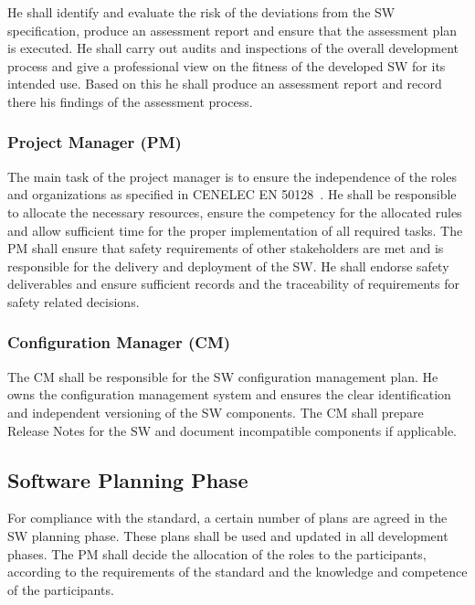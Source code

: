 He shall identify and evaluate the risk of the deviations from the SW
specification, produce an assessment report and ensure that the assessment plan
is executed. He shall carry out audits and inspections of the overall
development process and give a professional view on the fitness of the developed
SW for its intended use. Based on this he shall produce an assessment report and
record there his findings of the assessment process.

\subsubsection{Project Manager (PM)}
\label{sec:project-manager}

The main task of the project manager is to ensure the independence of the roles
and organizations as specified in CENELEC EN 50128~\cite{EN-50128}. He shall be
responsible to allocate the necessary resources, ensure the competency for the
allocated rules and allow sufficient time for the proper implementation of all
required tasks. The PM shall ensure that safety requirements of other
stakeholders are met and is responsible for the delivery and deployment of the
SW. He shall endorse safety deliverables and ensure sufficient records and the
traceability of requirements for safety related decisions.

\subsubsection{Configuration Manager (CM)}
\label{sec:conf-manag}

The CM shall be responsible for the SW configuration management plan. He owns
the configuration management system and ensures the clear identification and
independent versioning of the SW components. The CM shall prepare Release Notes
for the SW and document incompatible components if applicable.

\subsection{Software Planning Phase}
\label{sec:documents--plan}

For compliance with the standard, a certain number of plans are agreed in the SW
planning phase. These plans shall be used and updated in all development
phases. The PM shall decide the allocation of the roles to the participants,
according to the requirements of the standard and the knowledge and competence
of the participants.

